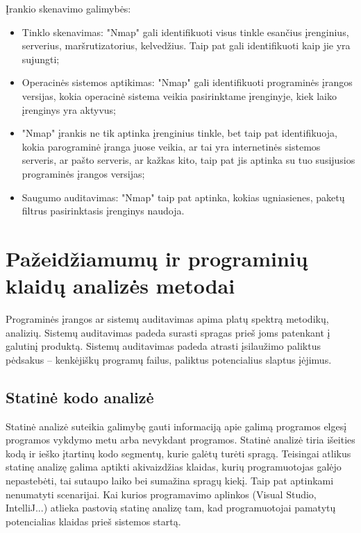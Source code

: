 \documentclass[a4paper,12pt,fleqn]{article}
\begin{document}
Įrankio skenavimo galimybės:
\begin{itemize}
	\item Tinklo skenavimas: "Nmap" gali identifikuoti visus tinkle esančius įrenginius, serverius, maršrutizatorius, kelvedžius. Taip pat gali identifikuoti kaip jie yra sujungti;
	\item Operacinės sistemos aptikimas: "Nmap" gali identifikuoti  programinės įrangos versijas, kokia operacinė sistema veikia pasirinktame įrenginyje, kiek laiko įrenginys yra aktyvus;
	\item "Nmap" įrankis ne tik aptinka įrenginius tinkle, bet taip pat identifikuoja, kokia parograminė įranga juose veikia, ar tai yra internetinės sistemos serveris, ar pašto serveris, ar kažkas kito, taip pat jis aptinka su tuo susijusios programinės įrangos versijas;
	\item Saugumo auditavimas: "Nmap" taip pat aptinka, kokias ugniasienes, paketų filtrus pasirinktasis įrenginys naudoja.
\end{itemize}

\newpage
\section{Pažeidžiamumų ir programinių klaidų analizės metodai}
\label{sec:sec2}

Programinės įrangos ar sistemų auditavimas apima platų spektrą metodikų, analizių. Sistemų auditavimas padeda surasti spragas prieš joms patenkant į galutinį produktą. Sistemų auditavimas padeda atrasti įsilaužimo paliktus pėdsakus – kenkėjiškų programų failus, paliktus potencialius slaptus įėjimus. 

\subsection{Statinė kodo analizė}
\label{sec:example}

\label{sec:data}
Statinė analizė suteikia galimybę gauti informaciją apie galimą programos elgesį programos vykdymo metu arba nevykdant programos. Statinė analizė tiria išeities kodą ir ieško įtartinų kodo segmentų, kurie galėtų turėti spragą. Teisingai atlikus statinę analizę galima aptikti akivaizdžias klaidas, kurių programuotojas galėjo nepastebėti, tai sutaupo laiko bei sumažina spragų kiekį\cite{Cowan:2003:SSO:858866.859050}. Taip pat aptinkami nenumatyti scenarijai. Kai kurios programavimo aplinkos (Visual Studio, IntelliJ...) atlieka pastovią statinę analizę tam, kad programuotojai pamatytų potencialias klaidas prieš sistemos startą. 
\end{document}
